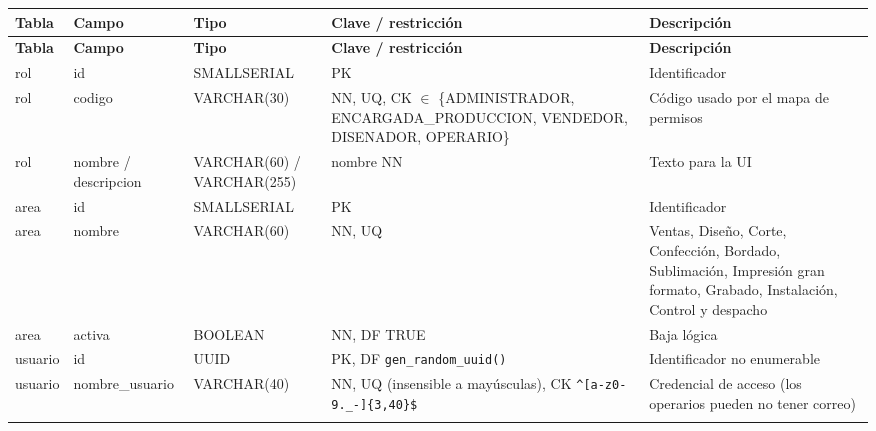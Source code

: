 \documentclass[11pt,a4paper]{article}
\begin{document}
\begingroup\small
\begin{longtable}{@{}>{\raggedright\arraybackslash\hspace{0pt}}p{}>{\raggedright\arraybackslash\hspace{0pt}}p{}>{\raggedright\arraybackslash\hspace{0pt}}p{}>{\raggedright\arraybackslash\hspace{0pt}}p{}>{\raggedright\arraybackslash\hspace{0pt}}p{}@{}}
\toprule
\textbf{Tabla} & \textbf{Campo} & \textbf{Tipo} & \textbf{Clave / restricción} & \textbf{Descripción} \\ \midrule
\endfirsthead
\toprule
\textbf{Tabla} & \textbf{Campo} & \textbf{Tipo} & \textbf{Clave / restricción} & \textbf{Descripción} \\ \midrule
\endhead
\bottomrule
\endlastfoot
\mbox{rol} & \mbox{id} & SMALLSERIAL & \mbox{PK} & Identificador \\ \addlinespace[0.25em]
\mbox{rol} & \mbox{codigo} & VARCHAR(30) & NN, UQ, CK \ensuremath{\in} \{ADMINISTRADOR, ENCARGADA\_\allowbreak{}PRODUCCION, VENDEDOR, DISENADOR, OPERARIO\} & Código usado por el mapa de permisos \\ \addlinespace[0.25em]
\mbox{rol} & nombre / descripcion & VARCHAR(60) / VARCHAR(255) & nombre NN & Texto para la UI \\ \addlinespace[0.25em]
\mbox{area} & \mbox{id} & SMALLSERIAL & \mbox{PK} & Identificador \\ \addlinespace[0.25em]
\mbox{area} & \mbox{nombre} & VARCHAR(60) & NN, UQ & Ventas, Diseño, Corte, Confección, Bordado, Sublimación, Impresión gran formato, Grabado, Instalación, Control y despacho \\ \addlinespace[0.25em]
\mbox{area} & \mbox{activa} & \mbox{BOOLEAN} & NN, DF TRUE & Baja lógica \\ \addlinespace[0.25em]
\mbox{usuario} & \mbox{id} & \mbox{UUID} & PK, DF \texttt{gen\_\allowbreak{}\allowbreak{}random\_\allowbreak{}\allowbreak{}uuid(\allowbreak{})} & Identificador no enumerable \\ \addlinespace[0.25em]
\mbox{usuario} & nombre\_\allowbreak{}usuario & VARCHAR(40) & NN, UQ (insensible a mayúsculas), CK \texttt{\textasciicircum{}[\allowbreak{}a-{}\allowbreak{}z0-{}\allowbreak{}9.\allowbreak{}\_\allowbreak{}\allowbreak{}-{}\allowbreak{}]\{\allowbreak{}3,\allowbreak{}40\}\$} & Credencial de acceso (los operarios pueden no tener correo) \\ \addlinespace[0.25em]

\end{longtable}
\end{document}
